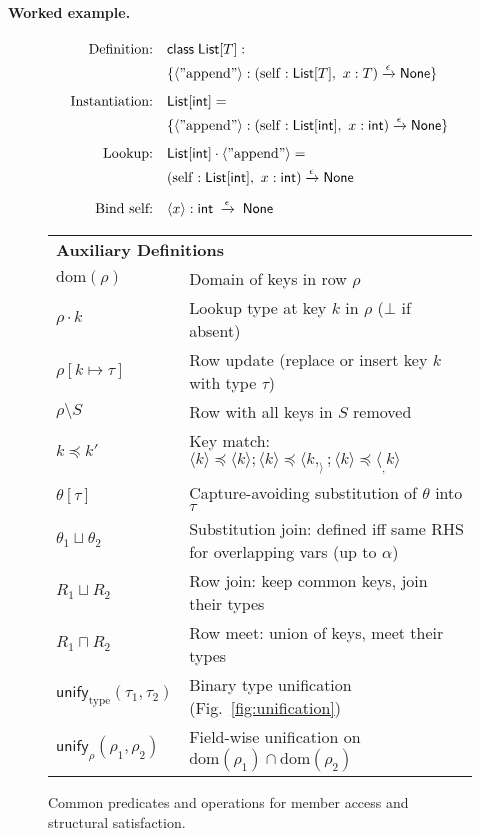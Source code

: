 \paragraph{Worked example.}
\[
\begin{aligned}
\text{Definition:} \quad & \mathsf{class}\; \mathsf{List}[T] :
\\ & \{\langle \mathrm{"append"} \rangle : (\mathrm{self}:\mathsf{List}[T],\ x:T) \xrightarrow{\epsilon} \mathsf{None} \} \\[0.5em]
\text{Instantiation:} \quad & \mathsf{List}[\mathsf{int}] =
\\ & \{\langle \mathrm{"append"} \rangle : (\mathrm{self}:\mathsf{List}[\mathsf{int}],\ x:\mathsf{int}) \xrightarrow{\epsilon} \mathsf{None} \} \\[0.5em]
\text{Lookup:} \quad & \mathsf{List}[\mathsf{int}] \cdot \langle \mathrm{"append"} \rangle =
\\ & (\mathrm{self}:\mathsf{List}[\mathsf{int}],\ x:\mathsf{int}) \xrightarrow{\epsilon} \mathsf{None} \\[0.5em]
\text{Bind self:} \quad & \langle x\rangle:\mathsf{int} \;\xrightarrow{\epsilon}\; \mathsf{None}
\end{aligned}
\]

\begin{figure}[t]
\centering
\renewcommand{\arraystretch}{1.2}
\begin{tabular}{l l}
\multicolumn{2}{l}{\textbf{Auxiliary Definitions}} \\[0.3em]
$\mathrm{dom}(\rho)$ & Domain of keys in row $\rho$ \\
$\rho \cdot k$ & Lookup type at key $k$ in $\rho$ ($\bot$ if absent) \\
$\rho[k \mapsto \tau]$ & Row update (replace or insert key $k$ with type $\tau$) \\
$\rho \setminus S$ & Row with all keys in $S$ removed \\
$k \preccurlyeq k'$ & Key match: $\langle k \rangle \preccurlyeq \langle k \rangle; \langle k \rangle \preccurlyeq \langle k, _ \rangle; \langle k \rangle \preccurlyeq \langle _, k \rangle$ \\
$\theta[\tau]$ & Capture-avoiding substitution of $\theta$ into $\tau$ \\
$\theta_1 \sqcup \theta_2$ & Substitution join: defined iff same RHS for overlapping vars (up to $\alpha$) \\
$R_1 \sqcup R_2$ & Row join: keep common keys, join their types \\
$R_1 \sqcap R_2$ & Row meet: union of keys, meet their types \\
$\mathsf{unify}_{\mathrm{type}}(\tau_1,\tau_2)$ & Binary type unification (Fig.~\ref{fig:unification}) \\
$\mathsf{unify}_{\rho}(\rho_1,\rho_2)$ & Field-wise unification on $\mathrm{dom}(\rho_1) \cap \mathrm{dom}(\rho_2)$
\end{tabular}
\caption{Common predicates and operations for member access and structural satisfaction.}
\label{fig:auxiliary}
\end{figure}

